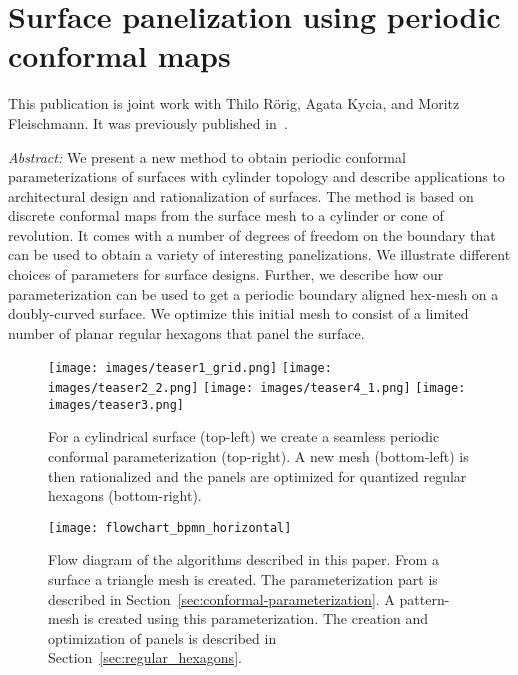 \documentclass[Thesis.tex]{subfiles}
\begin{document}
\chapter{Surface panelization using periodic conformal maps}
\label{chp:periodic_conformal_maps}

This publication is joint work with Thilo R\"orig, Agata Kycia, and 
Moritz Fleischmann. It was previously published in~\cite{Roerig2014}.

\emph{Abstract:} 
We present a new method to obtain periodic conformal parameterizations of
surfaces with cylinder topology and describe applications to
architectural design and rationalization of surfaces. The method is
based on discrete conformal maps from the surface mesh to a cylinder or
cone of revolution. It comes with a number of degrees of freedom on
the boundary that can be used to obtain a variety of interesting
panelizations. We illustrate different choices of parameters for
\nurbs surface designs. Further, we describe how our parameterization
can be used to get a periodic boundary aligned hex-mesh on a
doubly-curved surface. We optimize this initial mesh to consist of a
limited number of planar regular hexagons that panel the surface.

\begin{figure}
  \centering
  \texttt{[image: images/teaser1\_grid.png]}
  \texttt{[image: images/teaser2\_2.png]}
  \texttt{[image: images/teaser4\_1.png]}
  \texttt{[image: images/teaser3.png]}
  \caption{For a cylindrical \nurbs surface (top-left) we create a
    seamless periodic conformal parameterization (top-right). A new
    mesh (bottom-left) is then rationalized and the panels are
    optimized for quantized regular hexagons (bottom-right).}
  \label{fig:teaser2}
\end{figure}

\def\subfilebibliography{}


\begin{figure}[tb]
\centering
\texttt{[image: flowchart\_bpmn\_horizontal]}
\caption{Flow diagram of the algorithms described in this paper. From
  a \nurbs surface a triangle mesh is created. The parameterization
  part is described in Section~\ref{sec:conformal-parameterization}. A
  pattern-mesh is created using this parameterization. The creation
  and optimization of panels is described in
  Section~\ref{sec:regular_hexagons}.}
\label{fig:algorithm_diagram}
\end{figure}
\end{document}
